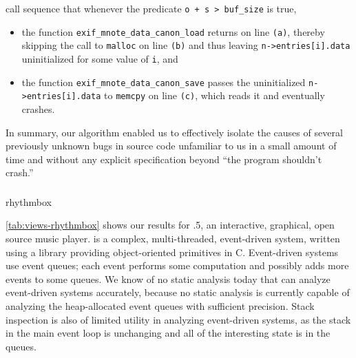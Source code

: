 call sequence that whenever the predicate \texttt{o + s > buf\_size} is true,
\begin{itemize}
\item the function \texttt{exif\_mnote\_data\_canon\_load} returns on
  line \texttt{(a)}, thereby skipping the call to \texttt{malloc} on
  line \texttt{(b)} and thus leaving \texttt{n->entries[i].data}
  uninitialized for some value of \texttt{i}, and

\item the function \texttt{exif\_mnote\_data\_canon\_save} passes the
  uninitialized \texttt{n->entries[i].data} to \texttt{memcpy} on line \texttt{(c)}, which reads it and eventually crashes.
\end{itemize}

In summary, our algorithm enabled us to effectively isolate the causes
of several previously unknown bugs in source code unfamiliar to us in
a small amount of time and without any explicit specification beyond
``the program shouldn't crash.''

\subsubsection{\rhythmbox}

\begingroup
\setlength{\segunit}{10pt}
\begin{view}[\tiny]{\rhythmbox}{rhythmbox}
  
\end{view}
\endgroup

\autoref{tab:views-rhythmbox} shows our results for .5,
an interactive, graphical, open source music player.  \rhythmbox is a
complex, multi-threaded, event-driven system, written using a library
providing object-oriented primitives in C.  Event-driven systems use
event queues; each event performs some computation and possibly adds
more events to some queues.  We know of no static analysis today that
can analyze event-driven systems accurately, because no static
analysis is currently capable of analyzing the heap-allocated event
queues with sufficient precision.  Stack inspection is also of
limited utility in analyzing event-driven systems, as the stack in the
main event loop is unchanging and all of the interesting state is in
the queues.

